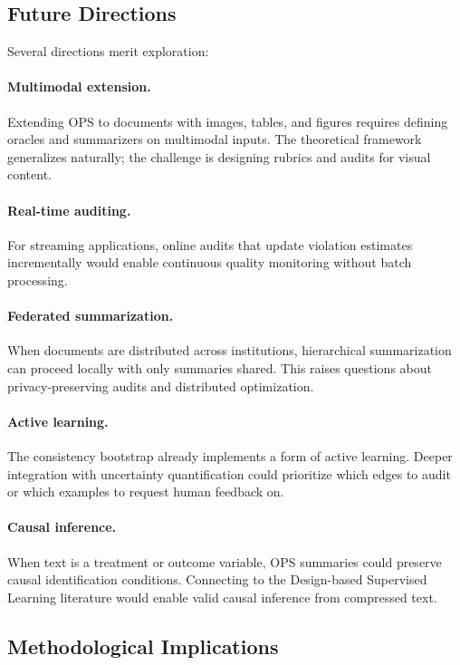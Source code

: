 \subsection{Future Directions}

Several directions merit exploration:

\paragraph{Multimodal extension.}
Extending OPS to documents with images, tables, and figures requires defining oracles and summarizers on multimodal inputs. The theoretical framework generalizes naturally; the challenge is designing rubrics and audits for visual content.

\paragraph{Real-time auditing.}
For streaming applications, online audits that update violation estimates incrementally would enable continuous quality monitoring without batch processing.

\paragraph{Federated summarization.}
When documents are distributed across institutions, hierarchical summarization can proceed locally with only summaries shared. This raises questions about privacy-preserving audits and distributed optimization.

\paragraph{Active learning.}
The consistency bootstrap already implements a form of active learning. Deeper integration with uncertainty quantification could prioritize which edges to audit or which examples to request human feedback on.

\paragraph{Causal inference.}
When text is a treatment or outcome variable, OPS summaries could preserve causal identification conditions. Connecting to the Design-based Supervised Learning literature \citep{EgamiEtAl2024} would enable valid causal inference from compressed text.

\subsection{Methodological Implications}

